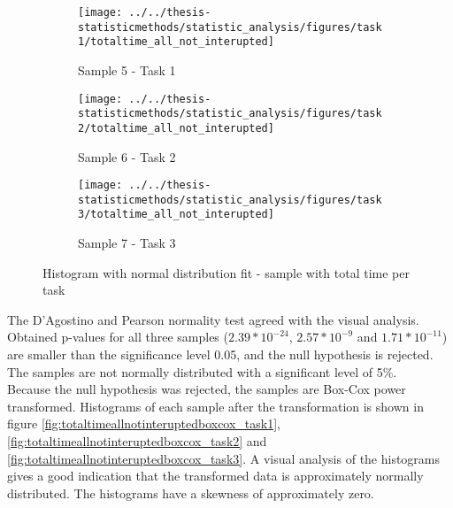 \begin{figure}[h!]
	\centering
	\begin{subfigure}[b]{0.3\textwidth}
		\centering
		\texttt{[image: ../../thesis-statisticmethods/statistic\_analysis/figures/task1/totaltime\_all\_not\_interupted]}
		\caption{Sample 5 - Task 1}
		\label{fig:totaltimeallnotinterupted_task1}
	\end{subfigure}
	\begin{subfigure}[b]{0.3\textwidth}
		\centering
		\texttt{[image: ../../thesis-statisticmethods/statistic\_analysis/figures/task2/totaltime\_all\_not\_interupted]}
		\caption{Sample 6 - Task 2}
		\label{fig:totaltimeallnotinterupted_task2}
	\end{subfigure}
	\begin{subfigure}[b]{0.3\textwidth}
		\centering
		\texttt{[image: ../../thesis-statisticmethods/statistic\_analysis/figures/task3/totaltime\_all\_not\_interupted]}
		\caption{Sample 7 - Task 3}
		\label{fig:totaltimeallnotinterupted_task3}
	\end{subfigure}
	\caption{Histogram with normal distribution fit - sample with total time per task}
\end{figure}

The D'Agostino and Pearson normality test agreed with the visual analysis. Obtained p-values for all three samples ($2.39 * 10^{-24}$, $2.57 * 10^{-9}$ and $1.71 * 10^{-11}$) are smaller than the significance level 0.05, and the null hypothesis is rejected. The samples are not normally distributed with a significant level of 5\%.\\[0.2cm]

Because the null hypothesis was rejected, the samples are Box-Cox power transformed. Histograms of each sample after the transformation is shown in figure \ref{fig:totaltimeallnotinteruptedboxcox_task1}, \ref{fig:totaltimeallnotinteruptedboxcox_task2} and \ref{fig:totaltimeallnotinteruptedboxcox_task3}. A visual analysis of the histograms gives a good indication that the transformed data is approximately normally distributed. The histograms have a skewness of approximately zero. 

